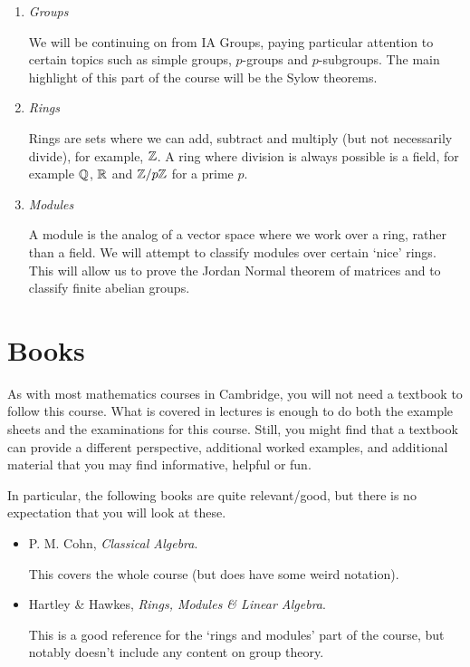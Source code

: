 \documentclass[a4paper]{scrreprt}
\begin{document}
\begin{enumerate}
	\item \emph{Groups}
	
	We will be continuing on from IA Groups, paying particular attention to certain topics such as simple groups, $p$-groups and $p$-subgroups. The main highlight of this part of the course will be the Sylow theorems.

	\item \emph{Rings}
	
	Rings are sets where we can add, subtract and multiply (but not necessarily divide), for example, $\mathbb{Z}$. A ring where division is always possible is a field, for example $\mathbb{Q}$, $\mathbb{R}$ and $\mathbb{Z}/p\mathbb{Z}$ for a prime $p$.

	\item \emph{Modules}
	
	A module is the analog of a vector space where we work over a ring, rather than a field. We will attempt to classify modules over certain `nice' rings. This will allow us to prove the Jordan Normal theorem of matrices and to classify finite abelian groups. 
\end{enumerate}

\section{Books}

As with most mathematics courses in Cambridge, you will not need a textbook to follow this course. What is covered in lectures is enough to do both the example sheets and the examinations for this course. Still, you might find that a textbook can provide a different perspective, additional worked examples, and additional material that you may find informative, helpful or fun.

In particular, the following books are quite relevant/good, but there is no expectation that you will look at these.

\begin{itemize}
	\item P. M. Cohn, \emph{Classical Algebra}.
	
	This covers the whole course (but does have some weird notation).

	\item Hartley \& Hawkes, \emph{Rings, Modules \& Linear Algebra}.
	
	This is a good reference for the `rings and modules' part of the course, but notably doesn't include any content on group theory.
\end{itemize}
\end{document}
